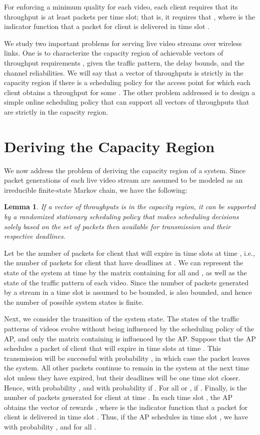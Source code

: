 \documentclass[10pt,nocopyrightspace]{sigplan-proc-varsize-1in}
\newtheorem{lemma}{Lemma}
\begin{document}
For enforcing a minimum quality for each video, each client  requires that its throughput is at least  packets per time slot; that is, it requires that , where  is the indicator function that a packet for client  is delivered in time slot .

We study two important problems for serving live video streams over wireless links. One is to characterize the capacity region of achievable vectors of throughput requirements , given the traffic pattern, the delay bounds, and the channel reliabilities. We will say that a vector of throughputs  is strictly in the capacity region if there is a scheduling policy for the access point for which each client  obtains a throughput  for some . The other problem addressed is to design a simple online scheduling policy that can support all vectors of throughputs that are strictly in the capacity region.

\section{Deriving the Capacity Region}	\label{section:feasibility}

We now address the problem of deriving the capacity region of a system. Since packet generations of each live video stream are assumed to be modeled as an irreducible finite-state Markov chain, we have the following:

\begin{lemma}	\label{lemma:feasibility:Markov}
If a vector of throughputs is in the capacity region, it can be supported by a randomized stationary scheduling policy that makes scheduling decisions solely based on the set of packets then available for transmission and their respective deadlines.
\end{lemma}

Let  be the number of packets for client  that will expire in  time slots at time , i.e., the number of packets for client  that have deadlines at . We can represent the state of the system at time  by the matrix containing  for all  and , as well as the state of the traffic pattern of each video. Since the number of packets generated by a stream in a time slot is assumed to be bounded,  is also bounded, and hence the number of possible system states is finite.

Next, we consider the transition of the system state. The states of the traffic patterns of videos evolve without being influenced by the scheduling policy of the AP, and only the matrix containing  is influenced by the AP. Suppose that the AP schedules a packet of client  that will expire in  time slots at time . This transmission will be successful with probability , in which case the packet leaves the system. All other packets continue to remain in the system at the next time slot unless they have expired, but their deadlines will be one time slot closer. Hence,  with probability , and  with probability  if . For all  or ,  if . Finally,  is the number of packets generated for client  at time . In each time slot , the AP obtains the vector of rewards , where  is the indicator function that a packet for client  is delivered in time slot . Thus, if the AP schedules  in time slot , we have  with probability , and  for all .
\end{document}
